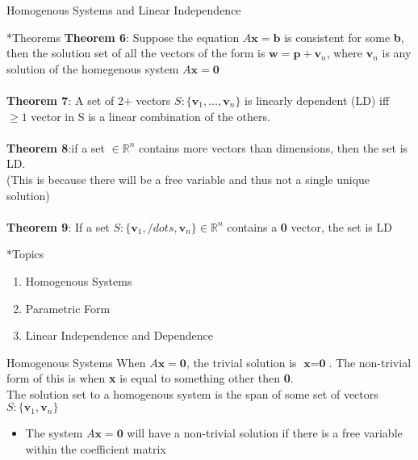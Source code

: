 \documentclass[a4paper, 12pt]{article}
\begin{document}
\newpage
\begin{section}{Homogenous Systems and Linear Independence}

\begin{subsection}*{Theorems}
\textbf{Theorem 6}: Suppose the equation $A\textbf{x}=\textbf{b}$ is
consistent for some \textbf{b}, then the solution set of all the 
vectors of the form is $\textbf{w}=\textbf{p}+\textbf{v}_n$, where
$\textbf{v}_n$ is any solution of the homegenous 
system $A\textbf{x}=\textbf{0}$
\\
\\ \textbf{Theorem 7}: A set of 2+ vectors $S:\lbrace\textbf{v}_1,\dots
,\textbf{v}_n\rbrace$ is linearly dependent (LD) iff $\geq 1$ vector 
in S is a linear combination of the others.\\
\\
\textbf{Theorem 8}:if a set $\in\mathbb{R}^n$ contains more vectors 
than dimensions, then the set is LD.\\
(This is because there will be a free variable and thus not a single
unique solution)
\\
\\ \textbf{Theorem 9}: If a set $S:\lbrace\textbf{v}_1,/dots
,\textbf{v}_n\rbrace \in\mathbb{R}^n$ contains a \textbf{0} vector, the
set is LD
\end{subsection}
\begin{subsection}*{Topics}
	\begin{enumerate}
	\item{Homogenous Systems}
	\item{Parametric Form}
	\item{Linear Independence and Dependence}
	\end{enumerate}
\end{subsection}
\begin{subsection}{Homogenous Systems}
When $A\textbf{x}=\textbf{0}$, the trivial solution is
$\textbf{x}=\textbf{0}$. The non-trivial form of this is when
\textbf{x} is equal to something other then \textbf{0}.\\
The solution set to a homogenous system is the span of some set of 
vectors $S:\lbrace\textbf{v}_1,\textbf{v}_n\rbrace$
\begin{itemize}
\item{The system $A\textbf{x}=\textbf{0}$
	will have a non-trivial solution if there is a free
	variable within the coefficient matrix}
\end{itemize}

\end{subsection}


\end{section}
\end{document}
